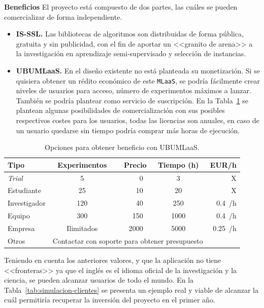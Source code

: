 \textbf{Beneficios}
El proyecto está compuesto de dos partes, las cuáles se pueden comercializar de forma independiente.
\begin{itemize}
\item \textbf{IS-SSL.} Las bibliotecas de algoritmos son distribuidas de forma pública, gratuita y sin publicidad, con el fin de aportar un <<granito de arena>> a la investigación en aprendizaje semi-supervisado y selección de instancias.
\item \textbf{UBUMLaaS.} En el diseño existente no está planteada su monetización. Si se quisiera obtener un rédito económico de este \texttt{MLaaS}, se podría fácilmente crear niveles de usuarios para acceso, número de experimentos máximos a lanzar. También se podría plantear como servicio de suscripción. En la Tabla~\ref{tab:opciones-beneficio} se plantean algunas posibilidades de comercialización con sus posibles respectivos costes para los usuarios, todas las licencias son anuales, en caso de un usuario quedarse sin tiempo podría comprar más horas de ejecución.
\end{itemize}

\begin{table}[H]
\centering
\begin{tabular}{lcrcr}
	\toprule
	\textbf{Tipo}          &\textbf{Experimentos} &  \textbf{Precio} & \textbf{Tiempo (h)} & EUR/h\\
	\midrule
	\textit{Trial}        & 5 & 0~\officialeuro & 3 & X\\
	Estudiante   & 25 & 10~\officialeuro & 20 & X\\
	Investigador  & 120 & 40~\officialeuro & 250 & 0.4~\officialeuro/h \\
	Equipo  & 300 & 150~\officialeuro & 1000 & 0.4~\officialeuro/h \\
	Empresa & Ilimitados & 2000~\officialeuro & 5000 & 0.25~\officialeuro/h \\
	Otros & \multicolumn{3}{c}{Contactar con soporte para obtener presupuesto} \\
	\bottomrule
\end{tabular}
\caption{Opciones para obtener beneficio con UBUMLaaS.}\label{tab:opciones-beneficio}
\end{table}

Teniendo en cuenta los anteriores valores, y que la aplicación no tiene <<fronteras>> ya que el inglés es el idioma oficial de la investigación y la ciencia, se pueden alcanzar usuarios de todo el mundo. En la Tabla~\ref{tab:simulacion-clientes} se presenta un ejemplo real y viable de alcanzar la cuál permitiría recuperar la inversión del proyecto en el primer año.

